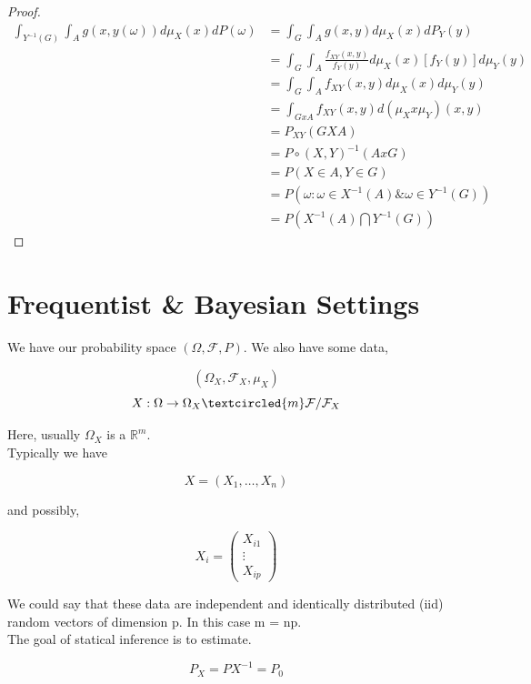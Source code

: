 \documentclass[11pt,fleqn]{book} %
\begin{document}
\begin{enumerate}
\begin{proof}
			\begin{align*}
				\int_{Y^{-1}(G)} \int_A g(x, y(\omega)) d\mu_X (x) dP(\omega) &= \int_{G} \int_A g(x, y) d\mu_X (x) dP_Y(y) \\
					&=\int_{G} \int_A \frac{f_{XY}(x, y)}{f_Y(y)} d\mu_X (x) [f_Y(y)] d\mu_Y(y) \\
					&=\int_{G} \int_A f_{XY}(x, y) d\mu_X (x) d\mu_Y(y)\\
					&=\int_{GxA} f_{XY}(x, y) d(\mu_X x \mu_Y)(x,y)\\
					&= P_{XY}(GXA) \\
					&= P \circ (X, Y)^{-1}(Ax G)\\
					&= P(X \in A, Y \in G)\\
					&= P(\omega: \omega \in X^{-1}(A) \& \omega \in Y^{-1}(G))\\
					&= P(X^{-1}(A) \bigcap Y^{-1}(G)) 
			\end{align*}
\end{proof}

\end{enumerate}
	
\section{Frequentist \& Bayesian Settings}

We have our probability space $(\Omega, \mathcal{F}, P)$. We also have some data, 

		$$(\Omega_X, \mathcal{F}_X, \mu_X)$$ 
		$$ X: \Omega \rightarrow \Omega_X \textcircled{m} \mathcal{F}/ \mathcal{F}_X$$

Here, usually $\Omega_X$ is a $\mathbb{R}^m$.\\

Typically we have 

	$$X = (X_1, \dots, X_n)$$

and possibly, 

	$$ X_i = \begin{pmatrix}
		X_{i1}\\
		\vdots\\
		X_{ip}
	\end{pmatrix}$$

We could say that these data are independent and identically distributed (iid) random vectors of dimension p. In this case m = np. \\

The goal of statical inference is to estimate.

		$$P_X = PX^{-1} = P_0$$
\end{document}
